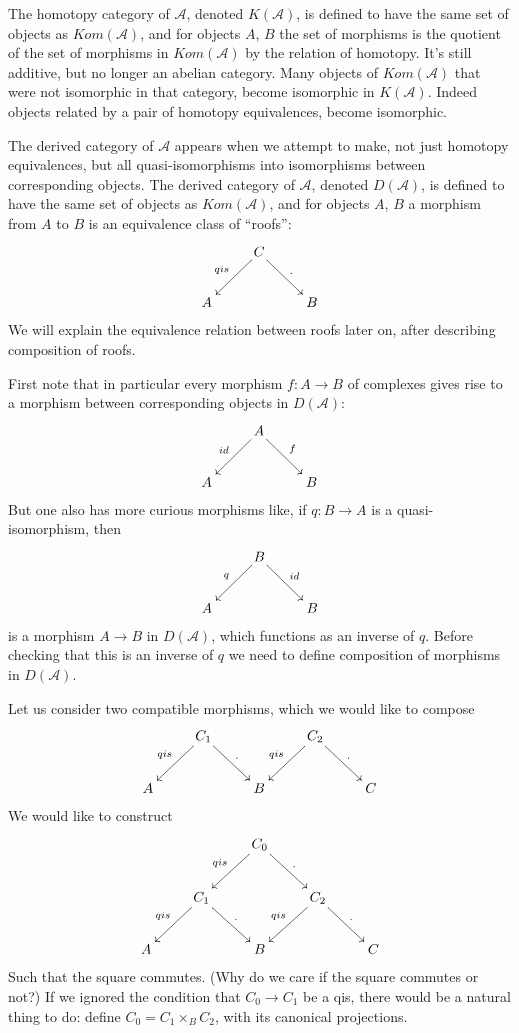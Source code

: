 \documentclass[12pt]{article}
\theoremstyle{plain}
\theoremstyle{definition}
\numberwithin{equation}{section}
\newcommand{\CA}{\mathcal{A}}
\begin{document}
The homotopy category of $\CA$, denoted $K(\CA)$, is defined to have the same set of objects as $Kom(\CA)$, and for objects $A$, $B$ the set of morphisms is the quotient of the set of morphisms in $Kom(\CA)$ by the relation of homotopy. It's still additive, but no longer an abelian category. Many objects of $Kom(\CA)$ that were not isomorphic in that category, become isomorphic in $K(\CA)$. Indeed objects related by a pair of homotopy equivalences, become isomorphic.

The derived category of $\CA$ appears when we attempt to make, not just homotopy equivalences, but all quasi-isomorphisms into isomorphisms between corresponding objects. The derived category of $\CA$, denoted $D(\CA)$, is defined to have the same set of objects as $Kom(\CA)$, and for objects $A$, $B$ a morphism from $A$ to $B$ is an equivalence class of ``roofs'':
\begin{align*}
\xymatrix{
 & C \ar@{->}[dl]_{qis} \ar@{->}[dr]^{.} & \\
%
A & & B \\
}
\end{align*}
We will explain the equivalence relation between roofs later on, after describing composition of roofs.

First note that in particular every morphism $f : A \rightarrow B$ of complexes gives rise to a morphism between corresponding objects in $D(\CA)$:
\begin{align*}
\xymatrix{
 & A \ar@{->}[dl]_{id} \ar@{->}[dr]^{f} & \\
%
A & & B \\
}
\end{align*}
But one also has more curious morphisms like, if $q : B \rightarrow A$ is a quasi-isomorphism, then
\begin{align*}
\xymatrix{
 & B \ar@{->}[dl]_{q} \ar@{->}[dr]^{id} & \\
%
A & & B \\
}
\end{align*}
is a morphism $A \rightarrow B$ in $D(\CA)$, which functions as an inverse of $q$. Before checking that this is an inverse of $q$ we need to define composition of morphisms in $D(\CA)$.

Let us consider two compatible morphisms, which we would like to compose
\begin{align*}
\xymatrix{
 & C_1 \ar@{->}[dl]_{qis} \ar@{->}[dr]^{.} &  & C_2 \ar@{->}[dl]_{qis} \ar@{->}[dr]^{.} & \\
%
A & & B & & C \\
}
\end{align*}
We would like to construct
\begin{align*}
\xymatrix{
 & & C_0 \ar@{->}[dl]_{qis} \ar@{->}[dr]^{.} &  \\
%
& C_1 \ar@{->}[dl]_{qis} \ar@{->}[dr]^{.} &  & C_2 \ar@{->}[dl]_{qis} \ar@{->}[dr]^{.} & \\
%
A & & B & & C \\
}
\end{align*}
Such that the square commutes. (Why do we care if the square commutes or not?) If we ignored the condition that $C_0 \rightarrow C_1$ be a qis, there would be a natural thing to do: define $C_0 = C_1 \times_{B} C_2$, with its canonical projections.
\end{document}
